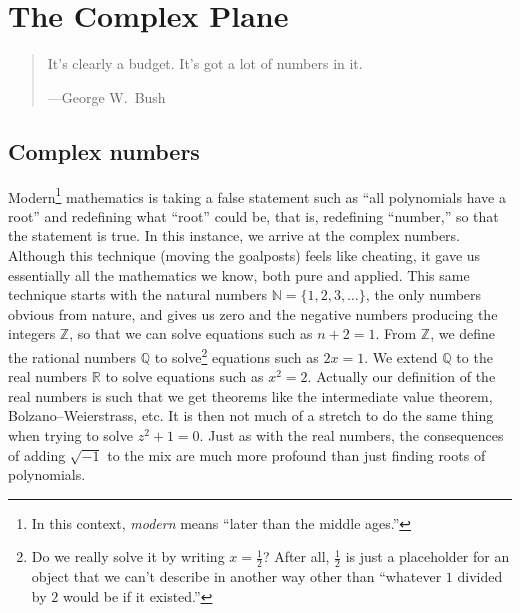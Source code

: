 \documentclass[12pt,openany]{book}
\newcommand{\R}{{\mathbb{R}}}
\newcommand{\Z}{{\mathbb{Z}}}
\newcommand{\N}{{\mathbb{N}}}
\newcommand{\Q}{{\mathbb{Q}}}
\theoremstyle{plain}
\theoremstyle{remark}
\theoremstyle{definition}
\newenvironment{myquote}{%
    \begin{quote}%
    \begingroup\itshape
}{%
    \endgroup%
    \end{quote}
}
\theoremstyle{exercise}
\theoremstyle{example}
\begin{document}
\chapter{The Complex Plane} \label{ch:complexplane}

\begin{myquote}
It's clearly a budget. It's got a lot of numbers in it.

---George W.\ Bush
\end{myquote}


\section{Complex numbers} \label{sec:complexnums}


Modern\footnote{In this context, \emph{modern}
means ``later than the middle ages.''}
mathematics
is taking a false statement such as ``all
polynomials have a root'' and redefining what ``root'' could be, that is,
redefining ``number,''
so that the statement is true.
In this instance, we arrive at the complex numbers.
Although this technique (moving the goalposts)
feels like cheating, it gave us
essentially all the mathematics we know, both pure and applied.
This same
technique starts with the natural numbers
$\N = \{ 1,2,3,\ldots \}$, the only
numbers obvious from nature,
and gives us zero and the negative numbers producing the integers
$\Z$, so that we can solve equations such as $n+2 = 1$.
From $\Z$, we define the rational numbers
$\Q$ to solve\footnote{%
Do we really solve it by writing $x = \frac{1}{2}$?  After all, 
$\frac{1}{2}$ is just a placeholder for an object that we can't describe
in another way other than ``whatever $1$ divided by $2$ would be if it existed.''}
equations such as $2x=1$.  We extend
$\Q$ to the real numbers $\R$
to solve equations such as $x^2=2$.  Actually our definition 
of the real numbers is such that we get theorems like the
intermediate value theorem, Bolzano--Weierstrass,
etc.  It is then not much of a stretch to do the same thing when trying
to solve $z^2+1=0$.  Just as with the real numbers,
the consequences of adding $\sqrt{-1}$ to the mix are much more
profound than just finding roots of polynomials.
\end{document}
